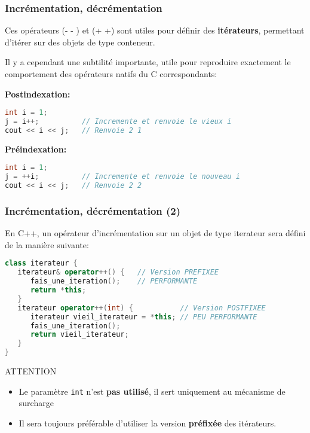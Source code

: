 \documentclass{beamer}
\begin{document}
\begin{frame}[fragile=singleslide,shrink=20]
\frametitle {Incrémentation, décrémentation}

Ces opérateurs (- - ) et (+ +) sont utiles pour définir des \textbf{itérateurs}, permettant d'itérer sur des objets de type conteneur.

Il y a cependant une subtilité importante, utile pour reproduire exactement le comportement des opérateurs natifs du C correspondants:

\textbf{Postindexation:}
\begin{lstlisting}[language=c++]
int i = 1;
j = i++;          // Incremente et renvoie le vieux i
cout << i << j;   // Renvoie 2 1
\end{lstlisting}

\textbf{Préindexation:}
\begin{lstlisting}[language=c++]
int i = 1;
j = ++i;          // Incremente et renvoie le nouveau i
cout << i << j;   // Renvoie 2 2
\end{lstlisting}
\end{frame}

\begin{frame}[fragile=singleslide,shrink=20]
\frametitle {Incrémentation, décrémentation (2)}

En C++, un opérateur d'incrémentation sur un objet de type iterateur sera défini de la manière suivante:
\begin{lstlisting}[language=c++]
class iterateur {
   iterateur& operator++() {   // Version PREFIXEE
      fais_une_iteration();    // PERFORMANTE
      return *this;
   }
   iterateur operator++(int) {           // Version POSTFIXEE
      iterateur vieil_iterateur = *this; // PEU PERFORMANTE
      fais_une_iteration();
      return vieil_iterateur;
   }
}
\end{lstlisting}
\begin{block}{ATTENTION}
\begin{itemize}
   \item{Le paramètre \texttt{int} n'est \textbf{pas utilisé}, il sert uniquement au mécanisme de surcharge}
   \item{Il sera toujours préférable d'utiliser la version \textbf{préfixée} des itérateurs.}
\end{itemize}
\end{block}
\end{frame}
\end{document}

